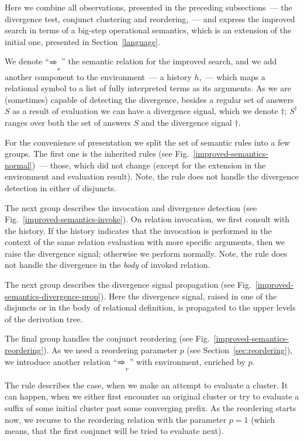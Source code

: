 Here we combine all observations, presented in the preceding subsections~--- the divergence test, conjunct clustering
and reordering,~--- and express the improved search in terms of a big-step operational semantics, which is an extension
of the initial one, presented in Section~\ref{language}.

We denote ``$\xRightarrow{}_e$'' the semantic relation for the improved search, and we add another component to the
environment~--- a history $h$,~--- which maps a relational symbol to a list of fully interpreted terms as its arguments.
As we are (sometimes) capable of detecting the divergence, besides a regular set of answers $S$ as a result of evaluation
we can have a divergence signal, which we denote $\dagger$; $S^\dagger$ ranges over both the set of answers $S$ and the divergence
signal $\dagger$.

For the convenience of presentation we split the set of semantic rules into a few groups. The first one is the inherited
rules (see Fig.~\ref{improved-semantics-normal})~--- those, which did not change (except for the extension in the
environment and evaluation result). Note, the rule  does not handle the divergence detection
in either of disjuncts.

The next group describes the invocation and divergence detection (see Fig.~\ref{improved-semantics-invoke}). On
relation invocation, we first consult with the history. If the history indicates that the invocation is performed in the
context of the same relation evaluation with more specific arguments, then we raise the divergence signal; otherwise
we perform normally. Note, the rule  does not handle the divergence in the \emph{body} of
invoked relation.

The next group describes the divergence signal propagation (see Fig.~\ref{improved-semantics-divergence-prop}). Here
the divergence signal, raised in one of the disjuncts or in the body of relational definition, is propagated to the upper
levels of the derivation tree.

The final group handles the conjunct reordering (see Fig.~\ref{improved-semantics-reordering}). As we need a reordering
parameter $p$ (see Section~\ref{sec:reordering}), we introduce another relation ``$\xRightarrow{}_r$'' with environment,
enriched by $p$.

The rule  describes the case, when we make an attempt to evaluate a cluster. It can happen, when
we either first encounter an original cluster or try to evaluate a suffix of some initial cluster past some converging
prefix. As the reordering starts now, we recurse to the reordering relation with the parameter \mbox{$p=1$} (which means,
that the first conjunct will be tried to evaluate next).

